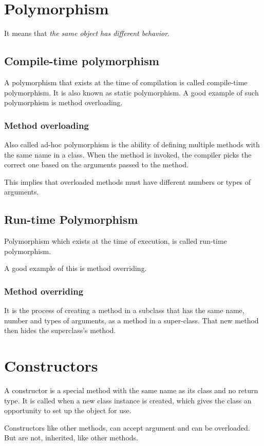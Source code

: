 \documentclass[a4paper, 12pt]{scrarticle}
\begin{document}
\section{Polymorphism}
It means that \emph{the same object has different behavior}.

\subsection{Compile-time polymorphism}
A polymorphism that exists at the time of compilation is called compile-time polymorphism. It is also known as static polymorphism. A good example of such polymorphism is method overloading.

\subsubsection{Method overloading}
Also called ad-hoc polymorphism is the ability of defining multiple methods with the same name in a class. When the method is invoked, the compiler picks the correct one based on the arguments passed to the method.

This implies that overloaded methods must have different numbers or types of arguments.

\subsection{Run-time Polymorphism}
Polymorphism which exists at the time of execution, is called run-time polymorphism.

A good example of this is method overriding.

\subsubsection{Method overriding}
It is the process of creating a method in a subclass that has the same name, number and types of arguments, as a method in a super-class. That new method then hides the superclass's method.

\section{Constructors}
A constructor is a special method with the same name as its class and no return type. It is called when a new class instance is created, which gives the class an opportunity to set up the object for use.

Constructors like other methods, can accept argument and can be overloaded. But are not, inherited, like other methods.
\end{document}
